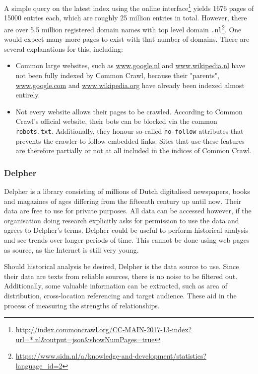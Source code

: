 A simple query on the latest index using the online interface\footnote{\url{http://index.commoncrawl.org/CC-MAIN-2017-13-index?url=*.nl&output=json&showNumPages=true}} yields 1676 pages of 15000 entries each, which are roughly 25 million entries in total. However, there are over 5.5 million registered domain names with top level domain \texttt{.nl}\footnote{\url{https://www.sidn.nl/a/knowledge-and-development/statistics?language_id=2}}. One would expect many more pages to exist with that number of domains. There are several explanations for this, including:
\begin{itemize}
\item Common large websites, such as \url{www.google.nl} and \url{www.wikipedia.nl} have not been fully indexed by Common Crawl, because their "parents", \url{www.google.com} and \url{www.wikipedia.org} have already been indexed almost entirely.
\item Not every website allows their pages to be crawled. According to Common Crawl's official website, their bots can be blocked via the common \texttt{robots.txt}. Additionally, they honour so-called \texttt{no-follow} attributes that prevents the crawler to follow embedded links. Sites that use these features are therefore partially or not at all included in the indices of Common Crawl.
\end{itemize}

\subsubsection{Delpher}
Delpher\cite{delpher} is a library consisting of millions of Dutch digitalised newspapers, books and magazines of ages differing from the fifteenth century up until now. Their data are free to use for private purposes. All data can be accessed however, if the organisation doing research explicitly asks for permission to use the data and agrees to Delpher's terms. Delpher could be useful to perform historical analysis and see trends over longer periods of time. This cannot be done using web pages as source, as the Internet is still very young.

Should historical analysis be desired, Delpher is the data source to use. Since their data are texts from reliable sources, there is no noise to be filtered out. Additionally, some valuable information can be extracted, such as area of distribution, cross-location referencing and target audience. These aid in the process of measuring the strengths of relationships.

